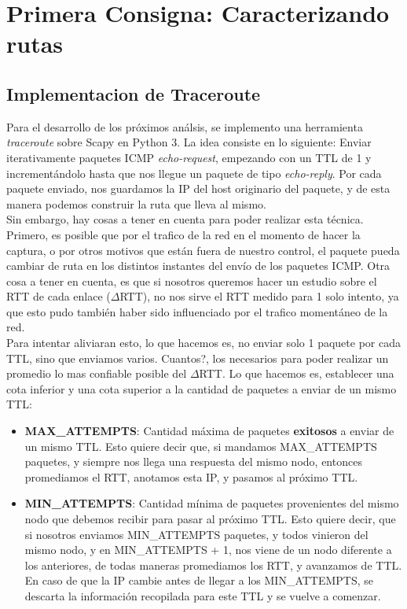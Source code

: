 \section{Primera Consigna: Caracterizando rutas}

\subsection{Implementacion de Traceroute}

Para el desarrollo de los próximos análsis, se implemento una herramienta \textit{traceroute} sobre Scapy en Python 3. La idea consiste en lo siguiente: Enviar iterativamente paquetes ICMP \textit{echo-request}, empezando con un TTL de 1 y incrementándolo hasta que nos llegue un paquete de tipo \textit{echo-reply}. Por cada paquete enviado, nos guardamos la IP del host originario del paquete, y de esta manera podemos construir la ruta que lleva al mismo. \\

Sin embargo, hay cosas a tener en cuenta para poder realizar esta técnica. Primero, es posible que por el trafico de la red en el momento de hacer la captura, o por otros motivos que están fuera de nuestro control, el paquete pueda cambiar de ruta en los distintos instantes del envío de los paquetes ICMP. Otra cosa a tener en cuenta, es que si nosotros queremos hacer un estudio sobre el RTT de cada enlace ($\Delta$RTT), no nos sirve el RTT medido para 1 solo intento, ya que esto pudo también haber sido influenciado por el trafico momentáneo de la red.\\

Para intentar aliviaran esto, lo que hacemos es, no enviar solo 1 paquete por cada TTL, sino que enviamos varios. Cuantos?, los necesarios para poder realizar un promedio lo mas confiable posible del $\Delta$RTT. Lo que hacemos es, establecer una cota inferior y una cota superior a la cantidad de paquetes a enviar de un mismo TTL:

\begin{itemize}
	\item \textbf{MAX\_ATTEMPTS}: Cantidad máxima de paquetes \textbf{exitosos} a enviar de un mismo TTL. Esto quiere decir que, si mandamos MAX\_ATTEMPTS paquetes, y siempre nos llega una respuesta del mismo nodo, entonces promediamos el RTT, anotamos esta IP, y pasamos al próximo TTL.
	\item \textbf{MIN\_ATTEMPTS}: Cantidad mínima de paquetes provenientes del mismo nodo que debemos recibir para pasar al próximo TTL. Esto quiere decir, que si nosotros enviamos MIN\_ATTEMPTS paquetes, y todos vinieron del mismo nodo, y en MIN\_ATTEMPTS + 1, nos viene de un nodo diferente a los anteriores, de todas maneras promediamos los RTT, y avanzamos de TTL. En caso de que la IP cambie antes de llegar a los MIN\_ATTEMPTS, se descarta la información recopilada para este TTL y se vuelve a comenzar.
\end{itemize}

